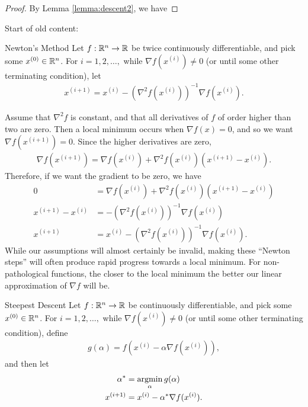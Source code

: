 \begin{proof}
    By Lemma \ref{lemma:descent2}, we have 
\end{proof}

\vspace{2cm}
{\color{Fuchsia}\Huge Start of old content:}

\begin{defn}{Newton's Method}\label{newtons-method}\proofbreak
    Let $f: \mathbb{R}^n \to \mathbb{R}$ be twice continuously differentiable, and pick some $x^{(0)} \in \mathbb{R}^n$. For $i = 1, 2, \ldots, $ while $\nabla f(x^{(i)}) \neq 0$ (or until some other terminating condition), let
    \begin{align*}
        x^{(i+1)} = x^{(i)} - \left(\nabla^2f(x^{(i)})\right)^{-1}\nabla f(x^{(i)}).
    \end{align*}
\end{defn}

\begin{rmk}
    Assume that $\nabla^2f$ is constant, and that all derivatives of $f$ of order higher than two are zero. Then a local minimum occurs when $\nabla f(x) = 0$, and so we want $\nabla f(x^{(i+1)}) = 0$. Since the higher derivatives are zero,
    \begin{align*}
        \nabla f(x^{(i+1)}) = \nabla f(x^{(i)}) + \nabla^2f(x^{(i)})(x^{(i+1)} - x^{(i)}).
    \end{align*}
    Therefore, if we want the gradient to be zero, we have
    \begin{align*}
        0 &= \nabla f(x^{(i)}) + \nabla^2f(x^{(i)})(x^{(i+1)} - x^{(i)}) \\
        x^{(i+1)} - x^{(i)} &= -\left(\nabla^2f(x^{(i)})\right)^{-1}\nabla f(x^{(i)}) \\
        x^{(i+1)} &= x^{(i)} - \left(\nabla^2f(x^{(i)})\right)^{-1}\nabla f(x^{(i)}).
    \end{align*}
    While our assumptions will almost certainly be invalid, making these ``Newton steps'' will often produce rapid progress towards a local minimum. For non-pathological functions, the closer to the local minimum the better our linear approximation of $\nabla f$ will be.
\end{rmk}

\begin{defn}{Steepest Descent}\label{steepest-method}\proofbreak
    Let $f: \mathbb{R}^n \to \mathbb{R}$ be continuously differentiable, and pick some $x^{(0)} \in \mathbb{R}^n$. 
    For $i = 1, 2, \ldots, $ while $\nabla f(x^{(i)}) \neq 0$ (or until some other terminating condition), define
    \begin{align*}
        g(\alpha) = f(x^{(i)} - \alpha\nabla f(x^{(i)})),
    \end{align*}
    and then let
    \begin{align*}
        \alpha^* &= \operatorname*{argmin}_{\alpha}g(\alpha) \\
        x^{(i+1)} &= x^{(i)} - \alpha^{*}\nabla f(x^{(i)}).
    \end{align*}
\end{defn}

